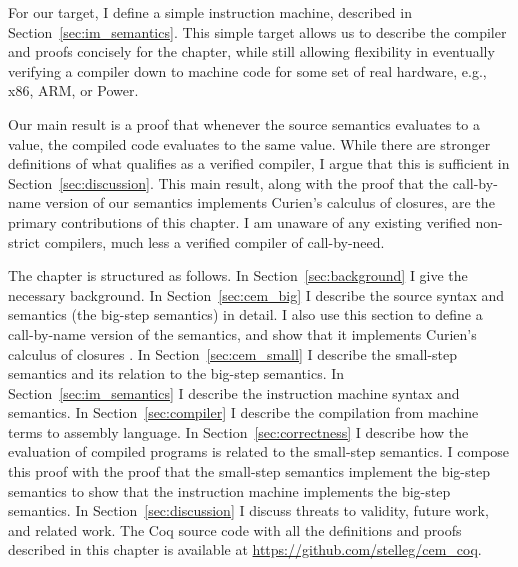 For our target, I define a simple instruction machine, described in
Section~\ref{sec:im_semantics}. This simple target allows us to describe the
compiler and proofs concisely for the chapter, while still allowing
flexibility in eventually verifying a compiler down to machine code for some
set of real hardware, e.g., x86, ARM, or Power. 

Our main result is a proof that whenever the source semantics evaluates to a
value, the compiled code evaluates to the same value. While there are stronger
definitions of what qualifies as a verified compiler, I argue that this is
sufficient in Section~\ref{sec:discussion}. This main result, along with the
proof that the call-by-name version of our semantics implements Curien's
calculus of closures, are the primary contributions of this chapter. I am
unaware of any existing verified non-strict compilers, much less a verified
compiler of call-by-need. 

The chapter is structured as follows. In Section~\ref{sec:background} I give the
necessary background. In Section~\ref{sec:cem_big} I describe the source syntax
and semantics (the big-step \ce semantics) in detail.  I also use
this section to define a call-by-name version of the semantics, and
show that it implements Curien's calculus of closures \cite{curien1991abstract}.  In
Section~\ref{sec:cem_small} I describe the small-step \ce semantics
and its relation to the big-step semantics. In Section~\ref{sec:im_semantics}
I describe the instruction machine syntax and semantics. In
Section~\ref{sec:compiler} I describe the compilation from machine terms to
assembly language. In Section~\ref{sec:correctness} I describe how the evaluation
of compiled programs is related to the small-step \ce semantics. I 
compose this proof with the proof that the small-step semantics implement the
big-step semantics to show that the instruction machine implements the big-step
semantics. In Section~\ref{sec:discussion} I discuss threats to validity,
future work, and related work. The Coq source code with all the definitions and
proofs described in this chapter is available at
\url{https://github.com/stelleg/cem\_coq}. 

